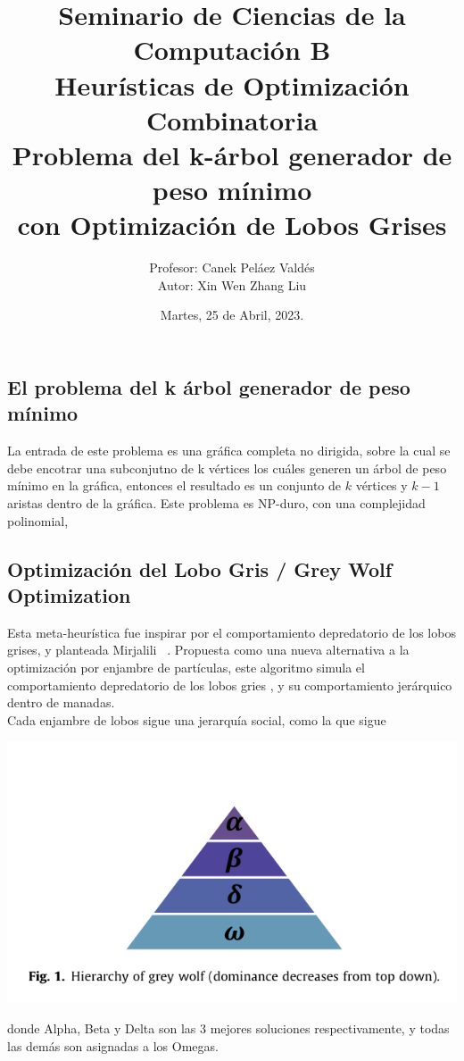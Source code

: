 \documentclass[a4paper]{article}
\title { \Large{Seminario de Ciencias de la Computaci\'on B}\protect\\
  \large{Heurísticas de Optimización Combinatoria}\protect\\
  \large{Problema del k-\'arbol generador de peso m\'inimo\\con Optimización de Lobos Grises}}
\date{\normalsize{Martes, 25 de Abril, 2023.}}
\author{\normalsize{Profesor: Canek Peláez Valdés}\protect\\
  \normalsize{Autor: Xin Wen Zhang Liu}}\vspace{0.2cm}
\begin{document}
\allowdisplaybreaks
\maketitle

\subsection*{El problema del k \'arbol generador de peso m\'inimo}
La entrada de este problema es una gr\'afica completa no dirigida, sobre la cual se debe encotrar una subconjutno de k v\'ertices los cu\'ales generen un \'arbol de peso m\'inimo en la gr\'afica, entonces el resultado es un conjunto de $k$ v\'ertices y $k-1$ aristas dentro de la gr\'afica. Este problema es NP-duro, con una complejidad polinomial, 


\subsection*{Optimizaci\'on del Lobo Gris / Grey Wolf Optimization}
Esta meta-heur\'istica fue inspirar por el comportamiento depredatorio de los lobos grises, y planteada Mirjalili
~\cite{MIRJALILI201446}. Propuesta como una nueva alternativa a la optimización por enjambre de
part\'iculas, este algoritmo simula el comportamiento depredatorio de los lobos gries , y su comportamiento jer\'arquico dentro de manadas.\\

Cada enjambre de lobos sigue una jerarqu\'ia social, como la que sigue
\begin{center}
  \includegraphics[width=\textwidth]{1682483544.png}
\end{center}

donde Alpha, Beta y Delta son las 3 mejores soluciones respectivamente, y todas las dem\'as son asignadas a los Omegas.
\end{document}
